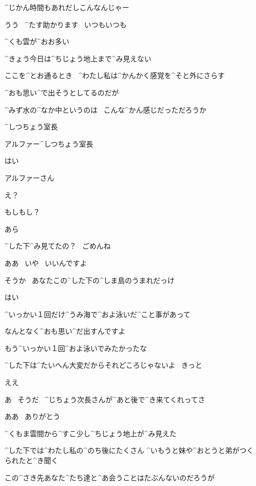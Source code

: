 \Alpha ^{じかん}{時間}もあれだしこんなんじゃー

\Kokone うう
\ ^{たす}{助}かります
\ いつもいつも

\page[42]
\ASevenMOne ^{くも}{雲}が^{おお}{多}い

\ASevenMOne ^{きょう}{今日}は^{ちじょう}{地上}まで^{み}{見}えない

\page
\ASevenMOne ここを^{とお}{通}るとき
\ ^{わたし}{私}は^{かんかく}{感覚}を^{そと}{外}にさらす

\page
\ASevenMOne ^{おも}{思}い^{で}{出}そうとしてるのだが

\ASevenMOne ^{みず}{水}の^{なか}{中}というのは
\ こんな^{かん}{感}じだっただろうか

\page
\Person ^{しつちょう}{室長}

\Person アルファー^{しつちょう}{室長}

\ASevenMOne はい

\Person アルファーさん

\ASevenMOne え？

\Person もしもし？

\Person あら

\Person ^{した}{下}^{み}{見}てたの？
\ ごめんね

\page
\ASevenMOne ああ
\ いや
\ いいんですよ

\Person そうか
\ あなたこの^{した}{下}の^{しま}{島}のうまれだっけ

\ASevenMOne はい

\ASevenMOne ^{いっかい}{１回}だけ^{うみ}{海}で^{およ}{泳}いだ^{こと}{事}があって

\ASevenMOne なんとなく^{おも}{思}い^{だ}{出}すんですよ

\page
\ASevenMOne もう^{いっかい}{１回}^{およ}{泳}いでみたかったな

\Person ^{した}{下}は^{たいへん}{大変}だからそれどころじゃないよ
\ きっと

\ASevenMOne ええ

\Person あ
\ そうだ
\ ^{じちょう}{次長}さんが^{あと}{後}で^{き}{来}てくれってさ

\ASevenMOne ああ
\ ありがとう

\page
\ASevenMOne ^{くもま}{雲間}から^{すこ}{少}し^{ちじょう}{地上}が^{み}{見}えた

\ASevenMOne ^{した}{下}では^{わたし}{私}の^{のち}{後}にたくさん
^{いもうと}{妹}や^{おとうと}{弟}がつくられたと^{き}{聞}く

\page
\ASevenMOne この^{さき}{先}あなた^{たち}{達}と^{あ}{会}うことはたぶんないのだろうが

